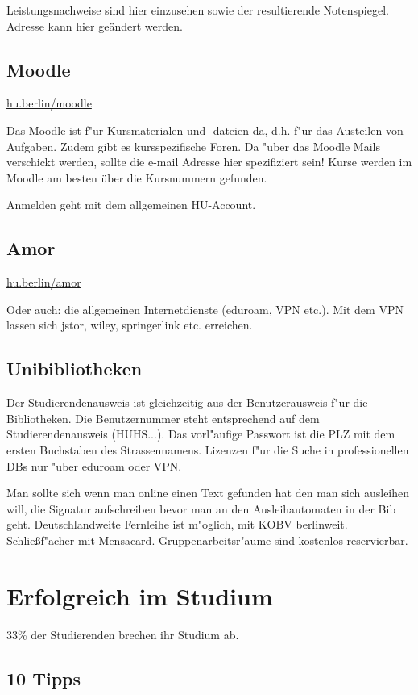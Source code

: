\documentclass[]{scrartcl}
\begin{document}
Leistungsnachweise sind hier einzusehen sowie der resultierende Notenspiegel. Adresse kann hier geändert werden.

\subsection{Moodle}
\url{hu.berlin/moodle}
\newline

Das Moodle ist f"ur Kursmaterialen und -dateien da, d.h. f"ur das Austeilen von Aufgaben. Zudem gibt es kursspezifische Foren. Da "uber das Moodle Mails verschickt werden, sollte die e-mail Adresse hier spezifiziert sein! Kurse werden im Moodle am besten über die Kursnummern gefunden.

Anmelden geht mit dem allgemeinen HU-Account. 

\subsection{Amor}
\url{hu.berlin/amor}
\newline

Oder auch: die allgemeinen Internetdienste (eduroam, VPN etc.).
Mit dem VPN lassen sich jstor, wiley, springerlink etc. erreichen.

\subsection{Unibibliotheken}

Der Studierendenausweis ist gleichzeitig aus der Benutzerausweis f"ur die Bibliotheken. Die Benutzernummer steht entsprechend auf dem Studierendenausweis (HUHS...). Das vorl"aufige Passwort ist die PLZ mit dem ersten Buchstaben des Strassennamens. Lizenzen f"ur die Suche in professionellen DBs nur "uber eduroam oder VPN.

Man sollte sich wenn man online einen Text gefunden hat den man sich ausleihen will, die Signatur aufschreiben bevor man an den Ausleihautomaten in der Bib geht. Deutschlandweite Fernleihe ist m"oglich, mit KOBV berlinweit. Schließf"acher mit Mensacard. Gruppenarbeitsr"aume sind kostenlos reservierbar.
\newpage


\section{Erfolgreich im Studium}

33\% der Studierenden brechen ihr Studium ab. 

\subsection{10 Tipps}
\end{document}

